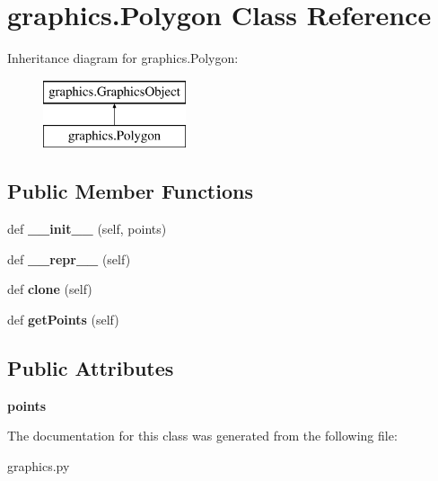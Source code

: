\hypertarget{classgraphics_1_1_polygon}{}\section{graphics.\+Polygon Class Reference}
\label{classgraphics_1_1_polygon}
Inheritance diagram for graphics.\+Polygon\+:\begin{figure}[H]
\begin{center}
\leavevmode
\includegraphics[height=2.000000cm]{classgraphics_1_1_polygon}
\end{center}
\end{figure}
\subsection*{Public Member Functions}
\begin{DoxyCompactItemize}
\item 
\mbox{\label{classgraphics_1_1_polygon_af9b2f0bcbfecc9d3c2aa5de28c0a3f38}} 
def {\bfseries \+\_\+\+\_\+init\+\_\+\+\_\+} (self, points)
\item 
\mbox{\label{classgraphics_1_1_polygon_aad12e39fa84c17812be4d1222bf4b33c}} 
def {\bfseries \+\_\+\+\_\+repr\+\_\+\+\_\+} (self)
\item 
\mbox{\label{classgraphics_1_1_polygon_aab7a0d81be6f10d4065c9687f5a8b80a}} 
def {\bfseries clone} (self)
\item 
\mbox{\label{classgraphics_1_1_polygon_a68417042ff193fc01179b274e120d947}} 
def {\bfseries get\+Points} (self)
\end{DoxyCompactItemize}
\subsection*{Public Attributes}
\begin{DoxyCompactItemize}
\item 
\mbox{\label{classgraphics_1_1_polygon_a3a5ff52b9aef1e15507e2724575da586}} 
{\bfseries points}
\end{DoxyCompactItemize}


The documentation for this class was generated from the following file\+:\begin{DoxyCompactItemize}
\item 
graphics.\+py\end{DoxyCompactItemize}
